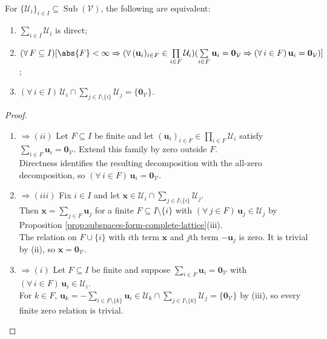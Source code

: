 \begin{proposition} \label{prop:internal-direct-sum-family-criterion} \\
For $\{\mathcal{U}_i\}_{i\in I}\subseteq\operatorname{Sub}(\mathcal{V})$, the following are equivalent:
\begin{enumerate}[label=(\roman*)]
\setlength{\itemsep}{0pt}
\item $\sum\limits_{i\in I}\mathcal{U}_i$ is direct;
\item $(\forall\,F\subseteq I)[\abs{F}<\infty\Rightarrow(\forall\,(\mathbf{u}_i)_{i\in F}\in\prod\limits_{i\in F}\mathcal{U}_i)(\sum\limits_{i\in F}\mathbf{u}_i=\mathbf{0}_{\mathcal{V}}\Rightarrow(\forall\,i\in F)\,\mathbf{u}_i=\mathbf{0}_{\mathcal{V}})]$;
\item $(\forall\,i\in I)\,\mathcal{U}_i\cap\sum\limits_{j\in I\setminus\{i\}}\mathcal{U}_j=\{\mathbf{0}_{\mathcal{V}}\}$.
\end{enumerate}
\begin{proof}
\begin{enumerate}[label=(\roman*)]
\setlength{\itemsep}{0pt}
\item[$(i)$] $\Rightarrow (ii)$ Let $F\subseteq I$ be finite and let $(\mathbf{u}_i)_{i\in F}\in\prod\limits_{i\in F}\mathcal{U}_i$ satisfy $\sum\limits_{i\in F}\mathbf{u}_i=\mathbf{0}_{\mathcal{V}}$. Extend this family by zero outside $F$.\\
Directness identifies the resulting decomposition with the all-zero decomposition, so $(\forall\,i\in F)\,\mathbf{u}_i=\mathbf{0}_{\mathcal{V}}$.
\item[$(ii)$] $\Rightarrow (iii)$ Fix $i\in I$ and let $\mathbf{x}\in\mathcal{U}_i\cap\sum\limits_{j\in I\setminus\{i\}}\mathcal{U}_j$.\\
Then $\mathbf{x}=\sum\limits_{j\in F}\mathbf{u}_j$ for a finite $F\subseteq I\setminus\{i\}$ with $(\forall\,j\in F)\,\mathbf{u}_j\in\mathcal{U}_j$ by Proposition \ref{prop:subspaces-form-complete-lattice}(iii).\\
The relation on $F\cup\{i\}$ with $i$th term $\mathbf{x}$ and $j$th term $-\mathbf{u}_j$ is zero. It is trivial by (ii), so $\mathbf{x}=\mathbf{0}_{\mathcal{V}}$.
\item[$(iii)$] $\Rightarrow (i)$ Let $F\subseteq I$ be finite and suppose $\sum\limits_{i\in F}\mathbf{u}_i=\mathbf{0}_{\mathcal{V}}$ with $(\forall\,i\in F)\,\mathbf{u}_i\in\mathcal{U}_i$.\\
For $k\in F$, $\mathbf{u}_k=-\sum\limits_{i\in F\setminus\{k\}}\mathbf{u}_i\in\mathcal{U}_k\cap\sum\limits_{j\in I\setminus\{k\}}\mathcal{U}_j=\{\mathbf{0}_{\mathcal{V}}\}$ by (iii), so every finite zero relation is trivial.\\

\end{enumerate}
\end{proof}
\end{proposition}
